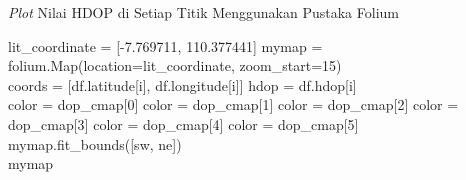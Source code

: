 \begin{algorithm}[H]
	\caption{\textit{Plot} Nilai HDOP di Setiap Titik Menggunakan Pustaka Folium}
	\label{alg: 3-plot-hdop}
	\begin{algorithmic}[1]
		\State lit\_coordinate = [-7.769711, 110.377441]
		\State mymap = folium.Map(location=lit\_coordinate, zoom\_start=15)
		\\
			\State coords = [df.latitude[i], df.longitude[i]]
			\State hdop = df.hdop[i]
			\\
				\State color = dop\_cmap[0]
				\State color = dop\_cmap[1]
				\State color = dop\_cmap[2]
				\State color = dop\_cmap[3]
				\State color = dop\_cmap[4]
			\Else
				\State color = dop\_cmap[5]
			\EndIf
		\EndFor
		\\
		\State mymap.fit\_bounds([sw, ne]) 
		\\
		\State mymap		
	\end{algorithmic}
\end{algorithm}